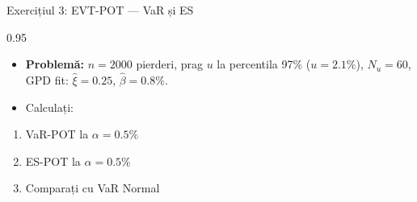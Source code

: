 \documentclass[9pt, aspectratio=169, t]{beamer}
\begin{document}
\begin{frame}{Exercițiul 3: EVT-POT --- VaR și ES}
    \begin{cminipage}{0.95\textwidth}
    \begin{itemize}\setlength{\itemsep}{0pt}
        \item \textbf{Problemă:} $n = 2000$ pierderi, prag $u$ la percentila 97\% ($u = 2.1\%$), $N_u = 60$, GPD fit: $\hat{\xi} = 0.25$, $\hat{\beta} = 0.8\%$.
        \item Calculați:
    \end{itemize}
    \begin{enumerate}\setlength{\itemsep}{0pt}
        \item VaR-POT la $\alpha = 0.5\%$
        \item ES-POT la $\alpha = 0.5\%$
        \item Comparați cu VaR Normal
    \end{enumerate}
    \end{cminipage}
\end{frame}
\end{document}
